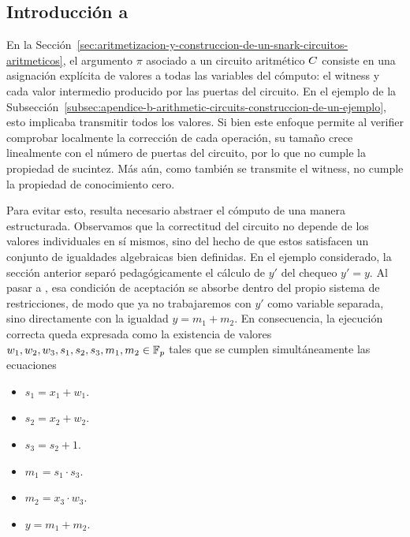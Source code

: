 
\subsection{Introducción a \ROneCS}
\label{subsec:apendice-b-r1cs-introduccion-a-ronecs}

En la Sección~\ref{sec:aritmetizacion-y-construccion-de-un-snark-circuitos-aritmeticos}, el argumento $\pi$ asociado a un circuito aritmético $C$ consiste en una asignación explícita de valores a todas las variables del cómputo: el witness y cada valor intermedio producido por las puertas del circuito. En el ejemplo de la Subsección~\ref{subsec:apendice-b-arithmetic-circuits-construccion-de-un-ejemplo}, esto implicaba transmitir todos los valores. Si bien este enfoque permite al verifier comprobar localmente la corrección de cada operación, su tamaño crece linealmente con el número de puertas del circuito, por lo que no cumple la propiedad de sucintez. Más aún, como también se transmite el witness, no cumple la propiedad de conocimiento cero.

Para evitar esto, resulta necesario abstraer el cómputo de una manera estructurada. Observamos que la correctitud del circuito no depende de los valores individuales en sí mismos, sino del hecho de que estos satisfacen un conjunto de igualdades algebraicas bien definidas. En el ejemplo considerado, la sección anterior separó pedagógicamente el cálculo de $y'$ del chequeo $y' = y$. Al pasar a \ROneCS, esa condición de aceptación se absorbe dentro del propio sistema de restricciones, de modo que ya no trabajaremos con $y'$ como variable separada, sino directamente con la igualdad $y = m_1 + m_2$. En consecuencia, la ejecución correcta queda expresada como la existencia de valores $w_1, w_2, w_3, s_1, s_2, s_3, m_1, m_2 \in \mathbb{F}_p$ tales que se cumplen simultáneamente las ecuaciones
\begin{itemize}[noitemsep]
	\item $s_1 = x_1 + w_1$.
	\item $s_2 = x_2 + w_2$.
	\item $s_3 = s_2 + 1$.
	\item $m_1 = s_1 \cdot s_3$.
	\item $m_2 = x_3 \cdot w_3$.
	\item $y = m_1 + m_2$.
\end{itemize}


